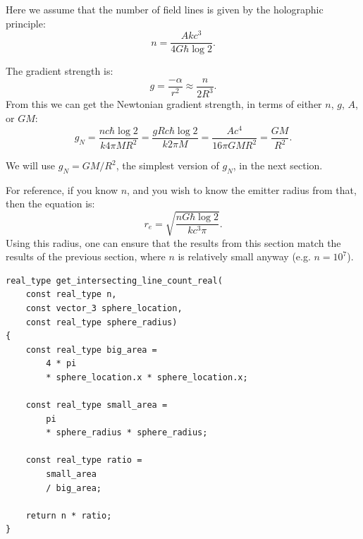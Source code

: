 \documentclass[12pt]{article}
\begin{document}
Here we assume that the number of field lines is given by the holographic principle:
\begin{equation}
n = \frac{A k c^3}{ 4 G \hbar \log 2}.
\end{equation}

The gradient strength is:
\begin{equation}
g = \frac{-\alpha}{r^2} \approx \frac{n}{2 R^3}.
\end{equation}
From this we can get the Newtonian gradient strength, in terms of either $n$, $g$, $A$, or $G M$:
\begin{equation}
\label{g_N_equation}
g_N = \frac{n c \hbar \log 2}{k 4 \pi M R^2} = \frac{g R c \hbar \log 2}{k 2 \pi M} = \frac{A c^4}{16 \pi G M R^2} = \frac{G M}{R^2}.
\end{equation}

We will use $g_N = {G M}/{R^2}$, the simplest version of $g_N$, in the next section.

For reference, if you know $n$, and you wish to know the emitter radius from that, then the equation is:
\begin{equation}
r_{\textit{e}} = \sqrt{\frac{n G \hbar \log 2}{k c^3 \pi}}.
\end{equation}
Using this radius, one can ensure that the results from this section match the results of the previous section, where $n$ is relatively small anyway (e.g. $n = 10^7$).

\begin{lstlisting}
real_type get_intersecting_line_count_real(
	const real_type n,
	const vector_3 sphere_location,
	const real_type sphere_radius)
{
	const real_type big_area =
		4 * pi
		* sphere_location.x * sphere_location.x;

	const real_type small_area =
		pi
		* sphere_radius * sphere_radius;

	const real_type ratio =
		small_area
		/ big_area;

	return n * ratio;
}
\end{lstlisting}
\end{document}
